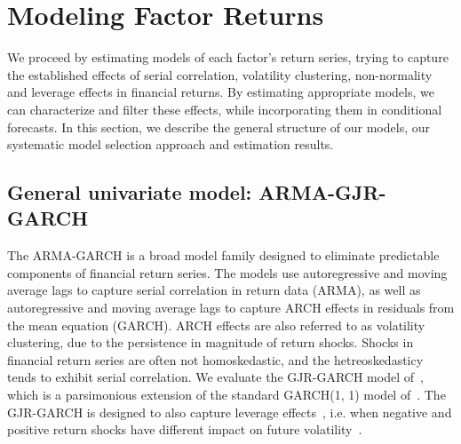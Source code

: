 
\section{Modeling Factor Returns} %
\label{sec:modeling_factor_returns}

We proceed by estimating models of each factor's return series, trying to capture the established effects of serial correlation, volatility clustering, non-normality and leverage effects in financial returns. By estimating appropriate models, we can characterize and filter these effects, while incorporating them in conditional forecasts. In this section, we describe the general structure of our models, our systematic model selection approach and estimation results.

\subsection{General univariate model: ARMA-GJR-GARCH} %
\label{sub:general_univariate_model_gjr_garch}

The ARMA-GARCH is a broad model family designed to eliminate predictable components of financial return series. The models use autoregressive and moving average lags to capture serial correlation in return data (ARMA), as well as autoregressive and moving average lags to capture ARCH effects in residuals from the mean equation (GARCH). ARCH effects are also referred to as volatility clustering, due to the persistence in magnitude of return shocks. Shocks in financial return series are often not homoskedastic, and the hetreoskedasticy tends to exhibit serial correlation. We evaluate the GJR-GARCH model of~\textcite{glosten1993relation}, which is a parsimonious extension of the standard GARCH(1, 1) model of~\autocite{Bollerslev1986}. The GJR-GARCH is designed to also capture leverage effects~\autocite{glosten1993relation}, i.e. when negative and positive return shocks have different impact on future volatility~\autocite{Black1976}.

